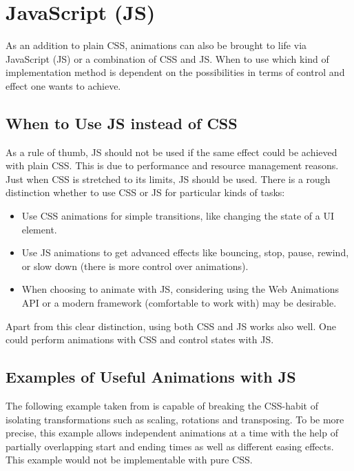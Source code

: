 %
%
% 
% 
% 


\chapter{JavaScript (JS)}

\label{chap:JS}

As an addition to plain CSS, animations can also be brought to life via JavaScript (JS) or a combination of CSS and JS. When to use which kind of implementation method is dependent on the possibilities in terms of control and effect one wants to achieve. 

\section{When to Use JS instead of CSS}

As a rule of thumb, JS should not be used if the same effect could be achieved with plain CSS. This is due to performance and resource management reasons. Just when CSS is stretched to its limits, JS should be used. There is a rough distinction whether to use CSS or JS for particular kinds of tasks:
\begin{itemize}
	\item Use CSS animations for simple transitions, like changing the state of a UI element.
	\item Use JS animations to get advanced effects like bouncing, stop, pause, rewind, or slow down (there is more control over animations).
	\item When choosing to animate with JS, considering using the Web Animations API or a modern framework (comfortable to work with) may be desirable.
\end{itemize}
Apart from this clear distinction, using both CSS and JS works also well. One could perform animations with CSS and control states with JS.
\citep{googleDev}

\section{Examples of Useful Animations with JS}

The following example taken from \citet{transformsJS} is capable of breaking the CSS-habit of isolating transformations such as scaling, rotations and transposing. To be more precise, this example allows independent animations at a time with the help of partially overlapping start and ending times as well as different easing effects. This example would not be implementable with pure CSS.

